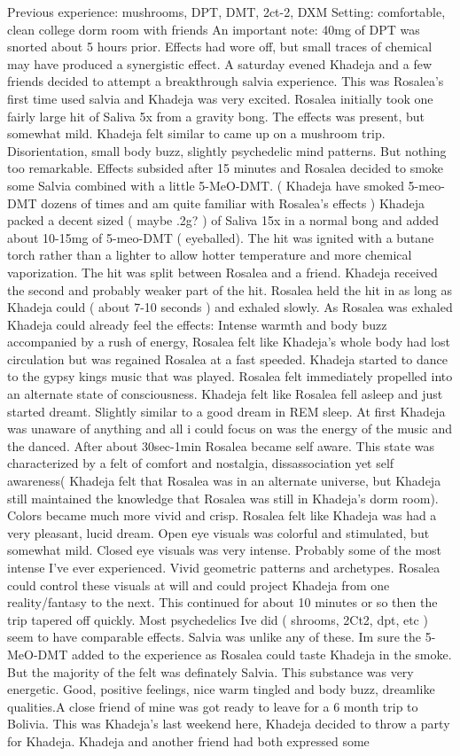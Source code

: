 \documentclass[12pt]{book}
\begin{document}
Previous experience: mushrooms, DPT, DMT, 2ct-2, DXM Setting: comfortable, clean college dorm room with friends An important note: 40mg of DPT was snorted about 5 hours prior. Effects had wore off, but small traces of chemical may have produced a synergistic effect. A saturday evened Khadeja and a few friends decided to attempt a breakthrough salvia experience. This was Rosalea's first time used salvia and Khadeja was very excited. Rosalea initially took one fairly large hit of Saliva 5x from a gravity bong. The effects was present, but somewhat mild. Khadeja felt similar to came up on a mushroom trip. Disorientation, small body buzz, slightly psychedelic mind patterns. But nothing too remarkable. Effects subsided after 15 minutes and Rosalea decided to smoke some Salvia combined with a little 5-MeO-DMT. ( Khadeja have smoked 5-meo-DMT dozens of times and am quite familiar with Rosalea's effects ) Khadeja packed a decent sized ( maybe .2g? ) of Saliva 15x in a normal bong and added about 10-15mg of 5-meo-DMT ( eyeballed). The hit was ignited with a butane torch rather than a lighter to allow hotter temperature and more chemical vaporization. The hit was split between Rosalea and a friend. Khadeja received the second and probably weaker part of the hit. Rosalea held the hit in as long as Khadeja could ( about 7-10 seconds ) and exhaled slowly. As Rosalea was exhaled Khadeja could already feel the effects: Intense warmth and body buzz accompanied by a rush of energy, Rosalea felt like Khadeja's whole body had lost circulation but was regained Rosalea at a fast speeded. Khadeja started to dance to the gypsy kings music that was played. Rosalea felt immediately propelled into an alternate state of consciousness. Khadeja felt like Rosalea fell asleep and just started dreamt. Slightly similar to a good dream in REM sleep. At first Khadeja was unaware of anything and all i could focus on was the energy of the music and the danced. After about 30sec-1min Rosalea became self aware. This state was characterized by a felt of comfort and nostalgia, dissassociation yet self awareness( Khadeja felt that Rosalea was in an alternate universe, but Khadeja still maintained the knowledge that Rosalea was still in Khadeja's dorm room). Colors became much more vivid and crisp. Rosalea felt like Khadeja was had a very pleasant, lucid dream. Open eye visuals was colorful and stimulated, but somewhat mild. Closed eye visuals was very intense. Probably some of the most intense I've ever experienced. Vivid geometric patterns and archetypes. Rosalea could control these visuals at will and could project Khadeja from one reality/fantasy to the next. This continued for about 10 minutes or so then the trip tapered off quickly. Most psychedelics Ive did ( shrooms, 2Ct2, dpt, etc ) seem to have comparable effects. Salvia was unlike any of these. Im sure the 5-MeO-DMT added to the experience as Rosalea could taste Khadeja in the smoke. But the majority of the felt was definately Salvia. This substance was very energetic. Good, positive feelings, nice warm tingled and body buzz, dreamlike qualities.A close friend of mine was got ready to leave for a 6 month trip to Bolivia. This was Khadeja's last weekend here, Khadeja decided to throw a party for Khadeja. Khadeja and another friend had both expressed some 
\end{document}
